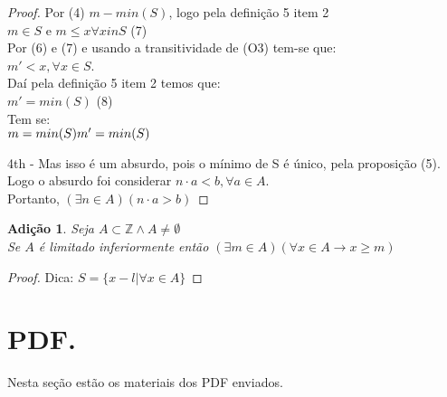 \documentclass[a4paper,12pt]{article}
\newtheorem{add}{Adição}
\begin{document}
\begin{proof}
  Por (4) $m - min(S)$, logo pela definição 5 item 2\\
  $m \in S$ e $m\leq x \forall x in S$ (7)\\
  Por (6) e (7) e usando a transitividade de (O3) tem-se que:\\
  $m' < x, \forall x \in S$.\\
  Daí pela definição 5 item 2 temos que:\\
  $m' = min(S)$ (8)\\
  Tem se:\\
  $
  m = min(S)\\
  m' = min (S)
  $

  4th - Mas isso é um absurdo, pois o mínimo de S é único, pela proposição (5). Logo o absurdo foi considerar $n \cdot a < b, \forall a \in A$.\\
  Portanto, $(\exists n \in A)(n \cdot a > b)$
\end{proof}


\begin{add} %
  Seja $A \subset \mathbb{Z} \wedge A \neq \emptyset$\\
  Se $A$ é limitado inferiormente então $(\exists m \in A)(\forall x \in A \longrightarrow x \geq m)$
\end{add}
\begin{proof}
  Dica: $S = \{x - l | \forall x \in A\}$
\end{proof}

\section{PDF.}

Nesta seção estão os materiais dos PDF enviados.



\end{document}
